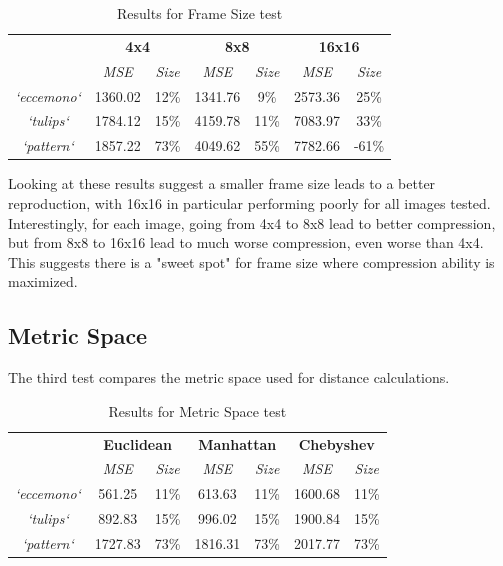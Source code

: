 \documentclass[a4paper,12pt]{article}
\begin{document}
\begin{table}[h!]
\footnotesize
\centering
\begin{tabular}{c|c|c|c|c|c|c|}
\cline{2-7}
 & \multicolumn{2}{c|}{\textbf{4x4}} & \multicolumn{2}{c|}{\textbf{8x8}} & \multicolumn{2}{c|}{\textbf{16x16}} \\ \cline{2-7} 
 & \textit{MSE} & \textit{Size} & \textit{MSE} & \textit{Size} & \textit{MSE} & \textit{Size} \\ \hline
\multicolumn{1}{|c|}{\textit{`eccemono`}} & 1360.02 & 12\% & 1341.76 & 9\% & 2573.36 & 25\% \\ \hline
\multicolumn{1}{|c|}{\textit{`tulips`}} & 1784.12 & 15\% & 4159.78 & 11\% & 7083.97 & 33\% \\ \hline
\multicolumn{1}{|c|}{\textit{`pattern`}} & 1857.22 & 73\% & 4049.62 & 55\% & 7782.66 & -61\% \\ \hline
\end{tabular}
\caption{Results for Frame Size test}
\end{table}

Looking at these results suggest a smaller frame size leads to a better reproduction, with 16x16 in particular performing poorly for all images tested. Interestingly, for each image, going from 4x4 to 8x8 lead to better compression, but from 8x8 to 16x16 lead to much worse compression, even worse than 4x4. This suggests there is a "sweet spot" for frame size where compression ability is maximized.

\subsection{Metric Space}

The third test compares the metric space used for distance calculations.

\begin{table}[h!]
\footnotesize
\centering
\begin{tabular}{c|c|c|c|c|c|c|}
\cline{2-7}
 & \multicolumn{2}{c|}{\textbf{Euclidean}} & \multicolumn{2}{c|}{\textbf{Manhattan}} & \multicolumn{2}{c|}{\textbf{Chebyshev}} \\ \cline{2-7} 
 & \textit{MSE} & \textit{Size} & \textit{MSE} & \textit{Size} & \textit{MSE} & \textit{Size} \\ \hline
\multicolumn{1}{|c|}{\textit{`eccemono`}} & 561.25 & 11\% & 613.63 & 11\% & 1600.68 & 11\% \\ \hline
\multicolumn{1}{|c|}{\textit{`tulips`}} & 892.83 & 15\% & 996.02 & 15\% & 1900.84 & 15\% \\ \hline
\multicolumn{1}{|c|}{\textit{`pattern`}} & 1727.83 & 73\% & 1816.31 & 73\% & 2017.77 & 73\% \\ \hline
\end{tabular}
\caption{Results for Metric Space test}
\end{table}
\end{document}
